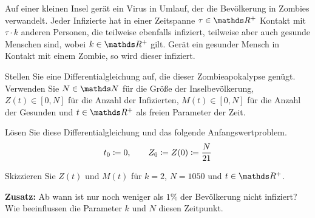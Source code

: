 \begin{atiTask}[
	title = Eine Zombieapokalypse,
	language = Deutsch
]
	Auf einer kleinen Insel gerät ein Virus in Umlauf, der die Bevölkerung in Zombies verwandelt.
	Jeder Infizierte hat in einer Zeitspanne $\tau\in\setR^+$ Kontakt mit $\tau\cdot k$ anderen Personen, die teilweise ebenfalls infiziert, teilweise aber auch gesunde Menschen sind, wobei $k\in\setR^+$ gilt.
	Gerät ein gesunder Mensch in Kontakt mit einem Zombie, so wird dieser infiziert.
	\medskip
	\begin{atiSubtasks}
		\item{
			Stellen Sie eine Differentialgleichung auf, die dieser Zombieapokalypse genügt.
			Verwenden Sie $N\in\setN$ für die Größe der Inselbevölkerung, $Z(t)\in[0,N]$ für die Anzahl der Infizierten, $M(t)\in[0,N]$ für die Anzahl der Gesunden und $t\in\setR^+$ als freien Parameter der Zeit.
		}
		\item{
			Lösen Sie diese Differentialgleichung und das folgende Anfangswertproblem.
			\[
				t_0\coloneqq 0,\qquad Z_0\coloneqq Z(0) \coloneqq \frac{N}{21}
			\]
		}
		\item{
			Skizzieren Sie $Z(t)$ und $M(t)$ für $k=2$, $N=1050$ und $t\in\setR^+$.
		}
		\item{
			\textbf{Zusatz:} Ab wann ist nur noch weniger als $1\unit{\%}$ der Bevölkerung nicht infiziert?
			Wie beeinflussen die Parameter $k$ und $N$ diesen Zeitpunkt.
		}
	\end{atiSubtasks}
\end{atiTask}